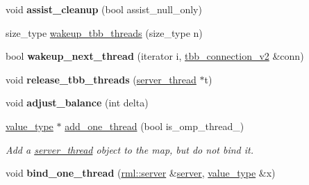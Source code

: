 \begin{DoxyCompactItemize}
\item 
\hypertarget{classrml_1_1internal_1_1thread__map_a05ab6e759575a57c6a34add7a757d77e}{}void {\bfseries assist\+\_\+cleanup} (bool assist\+\_\+null\+\_\+only)\label{classrml_1_1internal_1_1thread__map_a05ab6e759575a57c6a34add7a757d77e}

\item 
size\+\_\+type \hyperlink{classrml_1_1internal_1_1thread__map_a9c42750f9189e27c2952adea24584144}{wakeup\+\_\+tbb\+\_\+threads} (size\+\_\+type n)
\item 
\hypertarget{classrml_1_1internal_1_1thread__map_af08755b54c700eda6cbefdb509747f7f}{}bool {\bfseries wakeup\+\_\+next\+\_\+thread} (iterator i, \hyperlink{classrml_1_1internal_1_1tbb__connection__v2}{tbb\+\_\+connection\+\_\+v2} \&conn)\label{classrml_1_1internal_1_1thread__map_af08755b54c700eda6cbefdb509747f7f}

\item 
\hypertarget{classrml_1_1internal_1_1thread__map_a4023425963a1d53527c63f47a0deb8c4}{}void {\bfseries release\+\_\+tbb\+\_\+threads} (\hyperlink{classrml_1_1internal_1_1server__thread}{server\+\_\+thread} $\ast$t)\label{classrml_1_1internal_1_1thread__map_a4023425963a1d53527c63f47a0deb8c4}

\item 
\hypertarget{classrml_1_1internal_1_1thread__map_ac3afdc24bdd2d73ab699653ead541aee}{}void {\bfseries adjust\+\_\+balance} (int delta)\label{classrml_1_1internal_1_1thread__map_ac3afdc24bdd2d73ab699653ead541aee}

\item 
\hyperlink{classrml_1_1internal_1_1thread__map__base_1_1value__type}{value\+\_\+type} $\ast$ \hyperlink{classrml_1_1internal_1_1thread__map_aa3487b9b383ff6b2c16324377e73ef41}{add\+\_\+one\+\_\+thread} (bool is\+\_\+omp\+\_\+thread\+\_\+)
\begin{DoxyCompactList}\small\item\em Add a \hyperlink{classrml_1_1internal_1_1server__thread}{server\+\_\+thread} object to the map, but do not bind it. \end{DoxyCompactList}\item 
\hypertarget{classrml_1_1internal_1_1thread__map_a3dfcea79b46fc794121fc4f1a9f9456e}{}void {\bfseries bind\+\_\+one\+\_\+thread} (\hyperlink{classrml_1_1server}{rml\+::server} \&\hyperlink{classrml_1_1server}{server}, \hyperlink{classrml_1_1internal_1_1thread__map__base_1_1value__type}{value\+\_\+type} \&x)\label{classrml_1_1internal_1_1thread__map_a3dfcea79b46fc794121fc4f1a9f9456e}


\end{DoxyCompactItemize}
